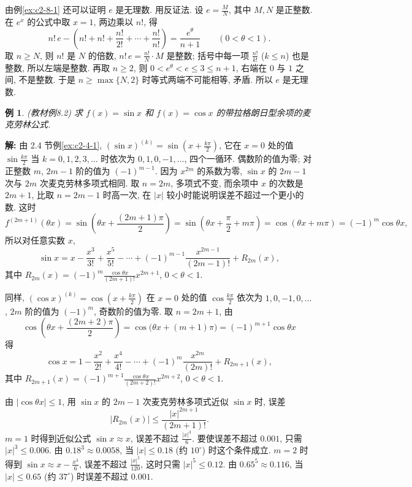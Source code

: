 \documentclass[UTF8,openany]{ctexbook}
\theoremstyle{chinesetextbook}
\newtheorem{example}{例}[section]
\newenvironment{cnsolution}{\par\indent\textbf{解:} \ignorespaces}{\par}
\begin{document}
由例\ref{ex:c2-8-1} 还可以证明 $e$ 是无理数. 用反证法. 设 $\displaystyle e=\frac MN$, 其中 $M,N$ 是正整数. 在 $e^x$ 的公式中取 $x=1$, 两边乘以 $n!$, 得
\[
n!\,e-\left(n!+n!+\frac{n!}{2!}+\cdots+\frac{n!}{n!}\right)=\frac{e^\theta}{n+1}\qquad(0<\theta<1).
\]
取 $n\ge N$, 则 $n!$ 是 $N$ 的倍数, $\displaystyle n!\,e=\frac{n!}N\cdot M$ 是整数; 括号中每一项 $\displaystyle\frac{n!}{k!}$ ($k\le n$) 也是整数, 所以左端是整数. 再取 $n\ge2$, 则 $0<e^\theta<e\le3\le n+1$, 右端在 $0$ 与 $1$ 之间, 不是整数. 于是 $n\ge\max\{N,2\}$ 时等式两端不可能相等, 矛盾. 所以 $e$ 是无理数.
\begin{example}\label{ex:c2-8-2}
\textnormal{(教材例8.2)} 求 $f(x)=\sin x$ 和 $f(x)=\cos x$ 的带拉格朗日型余项的麦克劳林公式.
\end{example}
\begin{cnsolution}
由 2.4 节例\ref{ex:c2-4-1}, $\displaystyle(\sin x)^{(k)}=\sin\left(x+\frac{k\pi}2\right)$, 它在 $x=0$ 处的值 $\displaystyle\sin\frac{k\pi}2$ 当 $k=0,1,2,3,\ldots$ 时依次为 $0,1,0,-1,\ldots$, 四个一循环. 偶数阶的值为零; 对正整数 $m$, $2m-1$ 阶的值为 $(-1)^{m-1}$. 因为 $x^{2m}$ 的系数为零, $\sin x$ 的 $2m-1$ 次与 $2m$ 次麦克劳林多项式相同. 取 $n=2m$, 多项式不变, 而余项中 $x$ 的次数是 $2m+1$, 比取 $n=2m-1$ 时高一次, 在 $|x|$ 较小时能说明误差不超过一个更小的数. 这时
\[
f^{(2m+1)}(\theta x)=\sin\left(\theta x+\frac{(2m+1)\pi}2\right)=\sin\left(\theta x+\frac\pi2+m\pi\right)=\cos(\theta x+m\pi)=(-1)^m\cos\theta x,
\]
所以对任意实数 $x$,
\[
\sin x=x-\frac{x^3}{3!}+\frac{x^5}{5!}-\cdots+(-1)^{m-1}\frac{x^{2m-1}}{(2m-1)!}+R_{2m}(x),
\]
其中 $\displaystyle R_{2m}(x)=(-1)^m\frac{\cos\theta x}{(2m+1)!}x^{2m+1}$, $0<\theta<1$.

同样, $\displaystyle(\cos x)^{(k)}=\cos\left(x+\frac{k\pi}2\right)$ 在 $x=0$ 处的值 $\displaystyle\cos\frac{k\pi}2$ 依次为 $1,0,-1,0,\ldots$, $2m$ 阶的值为 $(-1)^m$, 奇数阶的值为零. 取 $n=2m+1$, 由
\[
\cos\left(\theta x+\frac{(2m+2)\pi}2\right)=\cos\bigl(\theta x+(m+1)\pi\bigr)=(-1)^{m+1}\cos\theta x
\]
得
\[
\cos x=1-\frac{x^2}{2!}+\frac{x^4}{4!}-\cdots+(-1)^m\frac{x^{2m}}{(2m)!}+R_{2m+1}(x),
\]
其中 $\displaystyle R_{2m+1}(x)=(-1)^{m+1}\frac{\cos\theta x}{(2m+2)!}x^{2m+2}$, $0<\theta<1$.
\end{cnsolution}
由 $|\cos\theta x|\le1$, 用 $\sin x$ 的 $2m-1$ 次麦克劳林多项式近似 $\sin x$ 时, 误差
\[
|R_{2m}(x)|\le\frac{|x|^{2m+1}}{(2m+1)!}.
\]
$m=1$ 时得到近似公式 $\sin x\approx x$, 误差不超过 $\displaystyle\frac{|x|^3}6$. 要使误差不超过 $0.001$, 只需 $|x|^3\le0.006$. 由 $0.18^3\approx0.0058$, 当 $|x|\le0.18$ (约 $10^\circ$) 时这个条件成立. $m=2$ 时得到 $\displaystyle\sin x\approx x-\frac{x^3}6$, 误差不超过 $\displaystyle\frac{|x|^5}{120}$, 这时只需 $|x|^5\le0.12$. 由 $0.65^5\approx0.116$, 当 $|x|\le0.65$ (约 $37^\circ$) 时误差不超过 $0.001$.
\end{document}
